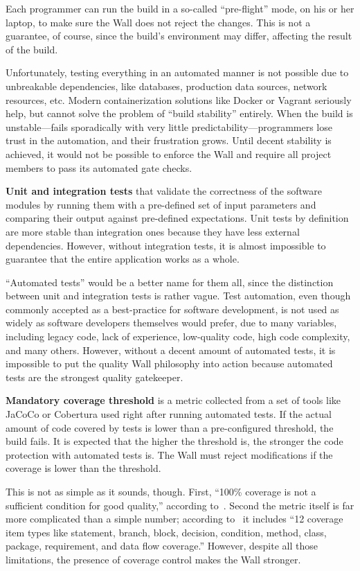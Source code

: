 \documentclass{main}
\begin{document}
Each programmer can run the build in a so-called ``pre-flight'' mode, on
his or her laptop, to make sure the Wall does not reject the changes. This
is not a guarantee, of course, since the build's environment may differ, affecting the result of the build.

Unfortunately, testing everything in an automated manner is not possible
due to unbreakable dependencies, like databases, production data sources,
network resources, etc. Modern containerization solutions like Docker or Vagrant
seriously help, but cannot solve the problem of ``build stability'' entirely.
When the build is unstable---fails sporadically with very little
predictability---programmers lose trust in the automation, and their
frustration grows. Until decent stability is achieved, it would
not be possible to enforce the Wall and require all project members
to pass its automated gate checks.

\textbf{Unit and integration tests} that validate the correctness of the
software modules by running them with a pre-defined set of input parameters
and comparing their output against pre-defined expectations. Unit tests
by definition are more stable than integration ones because they have
less external dependencies. However, without integration tests, it is almost
impossible to guarantee that the entire application works as a whole.

``Automated tests'' would be a better name for them all, since the distinction
between unit and integration tests is rather vague. Test automation,
even though commonly accepted as a best-practice for software
development, is not used as widely as software developers themselves would
prefer, due to many variables, including legacy code, lack of experience,
low-quality code, high code complexity, and many others. However, without a decent
amount of automated tests, it is impossible to put the quality Wall
philosophy into action because automated tests are the strongest quality gatekeeper.

\textbf{Mandatory coverage threshold} is a metric collected from a set of tools like JaCoCo or
Cobertura used right after running automated tests. If the actual amount of code covered by tests is lower than a pre-configured threshold, the build fails. It is
expected that the higher the threshold is, the stronger the code protection with
automated tests is. The Wall must reject modifications if the coverage
is lower than the threshold.

This is not as simple as it sounds, though.
First, ``100\% coverage is not a sufficient condition for good quality,''
according to~\textcite{prause2017}.
Second the metric itself is far more complicated than a simple number;
according to~\textcite{shahid2011} it includes ``12 coverage item types like statement,
branch, block, decision, condition, method, class, package,
requirement, and data flow coverage.''
However, despite all those limitations, the presence of coverage control
makes the Wall stronger.
\end{document}

